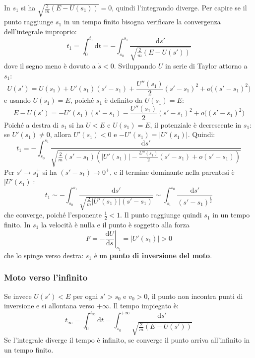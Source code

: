 \documentclass[11pt, a4paper, openright]{book}
\theoremstyle{plain}
\theoremstyle{definition}
\theoremstyle{remark}
\begin{document}
    In $s_1$ si ha $\sqrt{\frac{2}{m}(E - U(s_1))} = 0$, quindi l'integrando diverge. Per capire se il punto raggiunge $s_1$ in un tempo finito bisogna verificare la convergenza dell'integrale improprio:
    \begin{equation}
        t_1 = \int_{0}^{t_1} \mathrm{d}t = -\int_{s_0}^{s_1} \frac{\mathrm{d}s'}{\sqrt{\frac{2}{m}(E - U(s'))}}
    \end{equation}
    dove il segno meno è dovuto a $\dot{s} < 0$. Sviluppando $U$ in serie di Taylor attorno a $s_1$:
    \begin{equation}
        U(s') = U(s_1) + U'(s_1)(s' - s_1) + \frac{U''(s_1)}{2}(s' - s_1)^2 + o\big((s' - s_1)^2\big)
    \end{equation}
    e usando $U(s_1) = E$, poiché $s_1$ è definito da $U(s_1) = E$:
    \begin{equation}
        E - U(s') = -U'(s_1)(s' - s_1) - \frac{U''(s_1)}{2}(s' - s_1)^2 + o\big((s' - s_1)^2\big)
    \end{equation}
    Poiché a destra di $s_1$ si ha $U < E$ e $U(s_1) = E$, il potenziale è decrescente in $s_1$: se $U'(s_1) \neq 0$, allora $U'(s_1) < 0$ e $-U'(s_1) = |U'(s_1)|$. Quindi:
    \begin{equation}
        t_1 = -\int_{s_0}^{s_1} \frac{\mathrm{d}s'}{\sqrt{\frac{2}{m}(s' - s_1)\left(|U'(s_1)| - \frac{U''(s_1)}{2}(s' - s_1) + o(s' - s_1)\right)}}
    \end{equation}
    Per $s' \to s_1^+$ si ha $(s' - s_1) \to 0^+$, e il termine dominante nella parentesi è $|U'(s_1)|$:
    \begin{equation}
        t_1 \sim -\int_{s_0}^{s_1} \frac{\mathrm{d}s'}{\sqrt{\frac{2}{m}|U'(s_1)|(s' - s_1)}} \sim \int_{s_1}^{s_0} \frac{\mathrm{d}s'}{(s' - s_1)^{\frac{1}{2}}}
    \end{equation}
    che converge, poiché l'esponente $\frac{1}{2} < 1$. Il punto raggiunge quindi $s_1$ in un tempo finito. In $s_1$ la velocità è nulla e il punto è soggetto alla forza
    \begin{equation}
        F = -\left.\frac{\mathrm{d}U}{\mathrm{d}s}\right|_{s_1} = |U'(s_1)| > 0
    \end{equation}
    che lo spinge verso destra: $s_1$ è un \textbf{punto di inversione del moto}.

\subsubsection{Moto verso l'infinito}
    Se invece $U(s') < E$ per ogni $s' > s_0$ e $v_0 > 0$, il punto non incontra punti di inversione e si allontana verso $+\infty$. Il tempo impiegato è:
    \begin{equation}
        t_{\infty} = \int_{0}^{t_\infty} \mathrm{d}t = \int_{s_0}^{+\infty} \frac{\mathrm{d}s'}{\sqrt{\frac{2}{m}(E - U(s'))}}
    \end{equation}
    Se l'integrale diverge il tempo è infinito, se converge il punto arriva all'infinito in un tempo finito.
\end{document}
